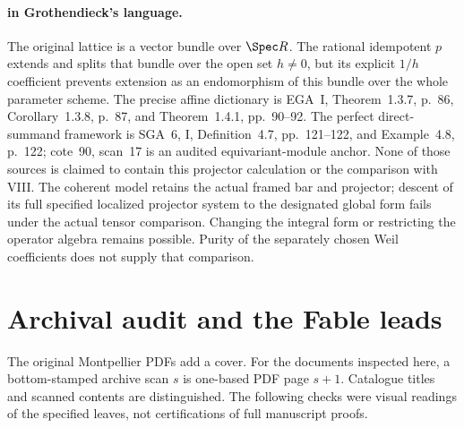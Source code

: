 \paragraph{ in Grothendieck's language.}
The original lattice is a vector bundle over $\Spec R$.
The rational idempotent $p$ extends and splits that bundle
over the open set $h\ne0$, but its explicit $1/h$ coefficient
prevents extension as an endomorphism of this bundle over
the whole parameter scheme. The precise affine dictionary is
EGA~I, Theorem~1.3.7, p.~86, Corollary~1.3.8, p.~87, and
Theorem~1.4.1, pp.~90--92.
The perfect direct-summand framework is SGA~6, I,
Definition~4.7, pp.~121--122, and Example~4.8, p.~122;
cote~90, scan~17 is an audited equivariant-module anchor.
None of those sources is claimed to contain this projector
calculation or the comparison with VIII.
The coherent model retains the actual framed bar and projector;
descent of its full specified localized projector system to
the designated global form fails under the actual tensor
comparison. Changing the integral form or restricting the
operator algebra remains possible. Purity of the separately
chosen Weil coefficients does not supply that comparison.

\section{Archival audit and the Fable leads}\label{sec:archive}
The original Montpellier PDFs add a cover. For the documents inspected here, a bottom-stamped archive scan $s$ is one-based PDF page $s+1$. Catalogue titles and scanned contents are distinguished. The following checks were visual readings of the specified leaves, not certifications of full manuscript proofs.

